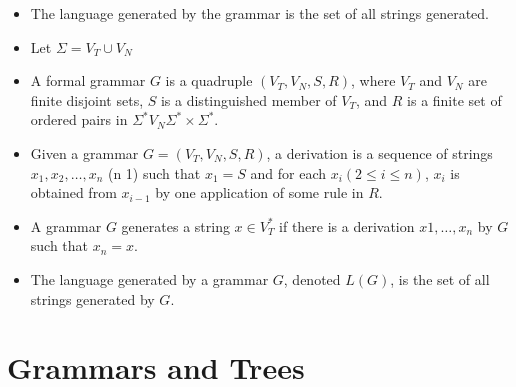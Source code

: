 \documentclass{beamer}
\begin{document}
	\begin{frame}
		\begin{itemize}
			\item The language generated by the grammar is the set of all strings generated.
		\end{itemize}
	\end{frame}


	\begin{frame}
		\begin{itemize}
			\item Let $\Sigma = V_T \cup V_N$
			\item A formal grammar $G$ is a quadruple $(V_T, V_N, S, R)$, where $V_T$ and $V_N$ are finite disjoint sets, $S$ is a distinguished member of $V_T$, and $R$ is a finite set of ordered pairs in $\Sigma^{*} V_N \Sigma^{*} \times \Sigma^{*}$.
		\end{itemize}
	\end{frame}


	\begin{frame}
		\begin{itemize}
			\item Given a grammar $G = (V_T, V_N, S, R)$, a derivation is a sequence of strings $x_1, x_2, \ldots ,x_n$ (n 1) such that $x_1 = S$ and for each $x_i (2 \leq i \leq n)$, $x_i$ is obtained from $x_{i-1}$ by one application of some rule in $R$.
		\end{itemize}
	\end{frame}


	\begin{frame}
		\begin{itemize}
			\item A grammar $G$ generates a string $x \in V_T^{*}$ if there is a derivation $x1, \ldots ,x_n$ by $G$ such that $x_n = x$.
		\end{itemize}
	\end{frame}


	\begin{frame}
		\begin{itemize}
			\item The language generated by a grammar $G$, denoted $L(G)$, is the set of all strings generated by $G$.
		\end{itemize}
	\end{frame}



	\section{Grammars and Trees}
\end{document}
